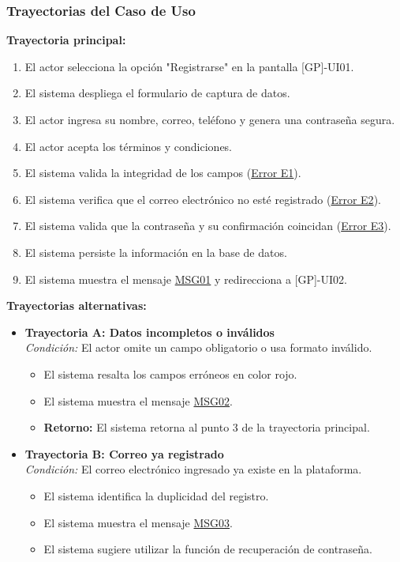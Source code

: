 \begin{appendices}
\subsubsection{Trayectorias del Caso de Uso}

\textbf{Trayectoria principal:}
\begin{enumerate}[nosep]
    \item El actor selecciona la opción "Registrarse" en la pantalla [GP]-UI01.
    \item El sistema despliega el formulario de captura de datos.
    \item El actor ingresa su nombre, correo, teléfono y genera una contraseña segura.
    \item El actor acepta los términos y condiciones.
    \item El sistema valida la integridad de los campos (\hyperlink{err:E1}{Error E1}).
    \item El sistema verifica que el correo electrónico no esté registrado (\hyperlink{err:E2}{Error E2}).
    \item El sistema valida que la contraseña y su confirmación coincidan (\hyperlink{err:E3}{Error E3}).
    \item El sistema persiste la información en la base de datos.
    \item El sistema muestra el mensaje \hyperlink{msg:MSG01}{MSG01} y redirecciona a [GP]-UI02.
\end{enumerate}

\textbf{Trayectorias alternativas:}

\begin{itemize}[leftmargin=*]
    \item \textbf{Trayectoria A: Datos incompletos o inválidos} \\
    \textit{Condición:} El actor omite un campo obligatorio o usa formato inválido.
    \begin{itemize}[nosep]
        \item[A-1:] El sistema resalta los campos erróneos en color rojo.
        \item[A-2:] El sistema muestra el mensaje \hyperlink{msg:MSG02}{MSG02}.
        \item \textbf{Retorno:} El sistema retorna al punto 3 de la trayectoria principal.
    \end{itemize}

    \item \textbf{Trayectoria B: Correo ya registrado} \\
    \textit{Condición:} El correo electrónico ingresado ya existe en la plataforma.
    \begin{itemize}[nosep]
        \item[B-1:] El sistema identifica la duplicidad del registro.
        \item[B-2:] El sistema muestra el mensaje \hyperlink{msg:MSG03}{MSG03}.
        \item[B-3:] El sistema sugiere utilizar la función de recuperación de contraseña.
    \end{itemize}


\end{itemize}
\end{appendices}
